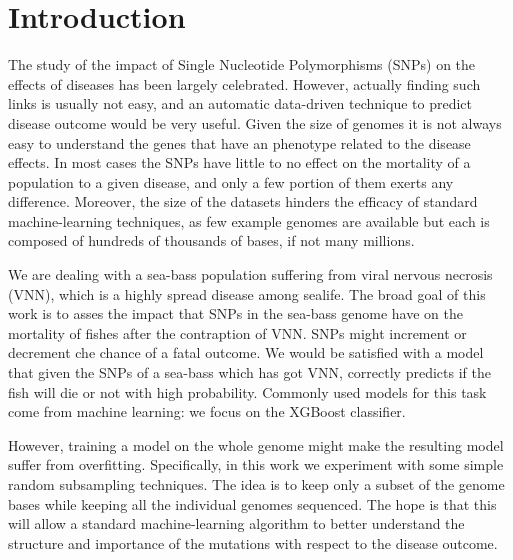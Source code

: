 \section{Introduction}
\label{sec:intro}
The study of the impact of Single Nucleotide Polymorphisms (SNPs) on the effects of diseases has been largely celebrated. 
However, actually finding such links is usually not easy, and an automatic data-driven technique to predict disease outcome would be very useful.
Given the size of genomes it is not always easy to understand the genes that have an phenotype related to the disease effects.
In most cases the SNPs have little to no effect on the mortality of a population to a given disease, and only a few portion of them exerts any difference.
Moreover, the size of the datasets hinders the efficacy of standard machine-learning techniques, as few example genomes are available but each is composed of hundreds of thousands of bases, if not many millions.

We are dealing with a sea-bass population suffering from viral nervous necrosis (VNN), which is a highly spread disease among sealife.
The broad goal of this work is to asses the impact that SNPs in the sea-bass genome have on the mortality of fishes after the contraption of VNN.
SNPs might increment or decrement che chance of a fatal outcome. 
We would be satisfied with a model that given the SNPs of a sea-bass which has got VNN, correctly predicts if the fish will die or not with high probability.
Commonly used models for this task come from machine learning: we focus on the XGBoost classifier.

However, training a model on the whole genome might make the resulting model suffer from overfitting.
Specifically, in this work we experiment with some simple random subsampling techniques.
The idea is to keep only a subset of the genome bases while keeping all the individual genomes sequenced.
The hope is that this will allow a standard machine-learning algorithm to better understand the structure and importance of the mutations with respect to the disease outcome.

